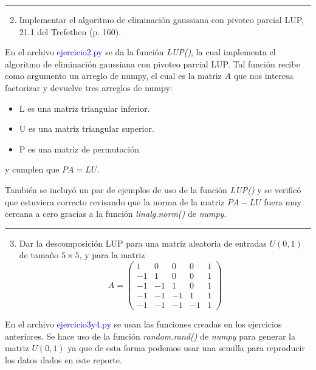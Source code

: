 \vspace{5mm}
{\color{lightgray} \hrule}
\begin{enumerate} \setcounter{enumi}{1}
	\item Implementar el algoritmo de eliminación gaussiana con pivoteo parcial LUP, 21.1 del Trefethen (p. 160).
\end{enumerate}

En el archivo \textcolor{mediumblue}{ejercicio2.py} se da la función \textit{LUP()}, la cual implementa el algoritmo de eliminación gaussiana con pivoteo parcial LUP. Tal función recibe como argumento un arreglo de numpy, el cual es la matriz $A$ que nos interesa factorizar y devuelve tres arreglos de numpy:
\begin{itemize}
	\item L es una matriz triangular inferior.
	\item U es una matriz triangular superior.
	\item P es una matriz de permutación
\end{itemize}
y cumplen que $PA=LU$.

También se incluyó un par de ejemplos de uso de la función \textit{LUP()} y se verificó que estuviera correcto revisando que la norma de la matriz $PA-LU$ fuera muy cercana a cero gracias a la función \textit{linalg.norm()} de \textit{numpy}.

\vspace{5mm}
{\color{lightgray} \hrule}
\begin{enumerate} \setcounter{enumi}{2}
	\item Dar la descomposición LUP para una matriz aleatoria de entradas $U(0,1)$ de tamaño $5 \times 5$, y para la matriz
\begin{equation}
	A=\left(\begin{array}{rrrrr}
		1 & 0 & 0 & 0 & 1 \\
		-1 & 1 & 0 & 0 & 1 \\
		-1 & -1 & 1 & 0 & 1 \\
		-1 & -1 & -1 & 1 & 1 \\
		-1 & -1 & -1 & -1 & 1
		\end{array}\right)
\end{equation}
\end{enumerate}

En el archivo \textcolor{mediumblue}{ejercicio3y4.py} se usan las funciones creadas en los ejercicios anteriores. Se hace uso de la función \textit{random.rand()} de \textit{numpy} para generar la matriz $U(0,1)$ ya que de esta forma podemos usar una semilla para reproducir los datos dados en este reporte.

